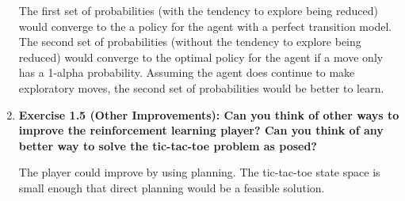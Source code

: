 \documentclass{article}
\begin{document}
\begin{enumerate}
		The first set of probabilities (with the tendency to explore being reduced) would converge to the a policy for
		the agent with a perfect transition model. The second set of probabilities (without the tendency to explore being
		reduced) would converge to the optimal policy for the agent if a move only has a 1-alpha probability. Assuming the
		agent does continue to make exploratory moves, the second set of probabilities would be better to learn.

		\item \textbf{Exercise 1.5 (Other Improvements): Can you think of other ways to improve the reinforcement learning player? Can you think of any better way to solve the
		tic-tac-toe problem as posed?}
		
		The player could improve by using planning. The tic-tac-toe state space is small enough that direct planning would be
		a feasible solution.

	\end{enumerate}
\end{document}
